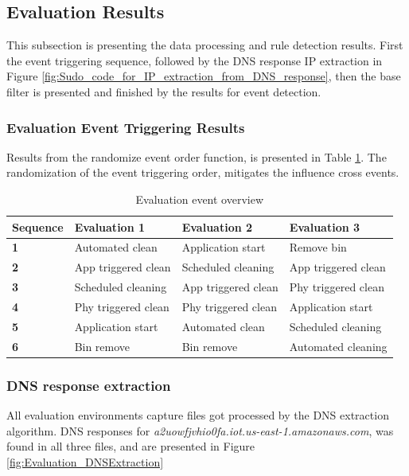 \subsection{Evaluation Results}

This subsection is presenting the data processing and rule detection results. First the event triggering sequence, followed by the DNS response IP extraction in Figure \ref{fig:Sudo_code_for_IP_extraction_from_DNS_response}, then the base filter is presented and finished by the results for event detection. 

\subsubsection{Evaluation Event Triggering Results}
Results from the randomize event order function, is presented in Table \ref{tab:evaleventoverview}. The randomization of the event triggering order, mitigates the influence cross events. 

\begin{table}[H]
\small
\centering
\caption{Evaluation event overview}
\label{tab:evaleventoverview}
\begin{tabular}{|l|l|l|l|}
\hline
\textbf{Sequence} & \textbf{Evaluation 1}          & \textbf{Evaluation 2}          & \textbf{Evaluation 3}          \\ \hline
\textbf{1}        & Automated clean                & Application start              & Remove bin                     \\ \hline
\textbf{2}        & App triggered clean            & Scheduled cleaning             & App triggered clean            \\ \hline
\textbf{3}        & Scheduled cleaning             & App triggered clean            & Phy triggered clean            \\ \hline
\textbf{4}        & Phy triggered clean            & Phy triggered clean            & Application start              \\ \hline
\textbf{5}        & Application start              & Automated clean                & Scheduled cleaning             \\ \hline
\textbf{6}        & Bin remove                     & Bin remove                     & Automated cleaning             \\ \hline
\end{tabular}
\end{table}

\subsubsection{DNS response extraction}
All evaluation environments capture files got processed by the DNS extraction algorithm. DNS responses for \textit{a2uowfjvhio0fa.iot.us-east-1.amazonaws.com}, was found in all three files, and are presented in Figure \ref{fig:Evaluation_DNSExtraction}

